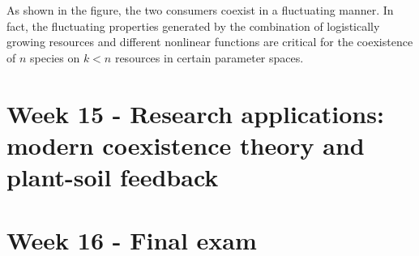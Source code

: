 \documentclass[
]{book}
\begin{document}
As shown in the figure, the two consumers coexist in a fluctuating manner. In fact, the fluctuating properties generated by the combination of logistically growing resources and different nonlinear functions are critical for the coexistence of \(n\) species on \(k<n\) resources in certain parameter spaces.

\hypertarget{week-15---research-applications-modern-coexistence-theory-and-plant-soil-feedback}{%
\chapter*{Week 15 - Research applications: modern coexistence theory and plant-soil feedback}\label{week-15---research-applications-modern-coexistence-theory-and-plant-soil-feedback}}

\hypertarget{week-16---final-exam}{%
\chapter*{Week 16 - Final exam}\label{week-16---final-exam}}

  
\end{document}
